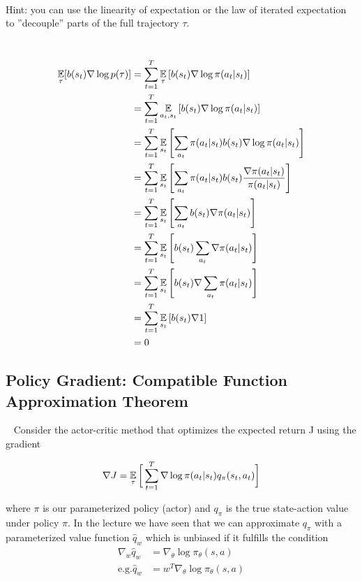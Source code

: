 \documentclass{exam}
\begin{document}
\begin{enumerate}
\begin{align*}
    \end{align*}
    Hint: you can use the linearity of expectation or the law of iterated expectation to ”decouple” parts of the full trajectory $\tau$.
    \begin{solutionorlines}[2in]
    \ \newline
    \begin{align*}
    \operatorname*{\mathbb{E}}_{\tau}[b(s_t) \nabla \log{p(\tau)}] &= \sum_{t=1}^T \operatorname*{\mathbb{E}}_{\tau}\left[b(s_t) \nabla \log{\pi(a_t|s_t)}\right]\\
    &= \sum_{t=1}^T \operatorname*{\mathbb{E}}_{a_t, s_t}\left[b(s_t) \nabla \log{\pi(a_t|s_t)}\right]\\
    &= \sum_{t=1}^T \operatorname*{\mathbb{E}}_{s_t}\left[\sum_{a_t} \pi(a_t|s_t) b(s_t) \nabla \log{\pi(a_t|s_t)}\right]\\
    &= \sum_{t=1}^T \operatorname*{\mathbb{E}}_{s_t}\left[\sum_{a_t} \pi(a_t|s_t) b(s_t) \frac{\nabla\pi(a_t|s_t)}{\pi(a_t|s_t)} \right]\\
    &= \sum_{t=1}^T \operatorname*{\mathbb{E}}_{s_t}\left[\sum_{a_t} b(s_t) \nabla\pi(a_t|s_t) \right]\\
    &= \sum_{t=1}^T \operatorname*{\mathbb{E}}_{s_t}\left[ b(s_t) \sum_{a_t} \nabla \pi(a_t|s_t) \right]\\
    &= \sum_{t=1}^T \operatorname*{\mathbb{E}}_{s_t}\left[ b(s_t)  \nabla \sum_{a_t} \pi(a_t|s_t) \right]\\
    &= \sum_{t=1}^T \operatorname*{\mathbb{E}}_{s_t}\left[ b(s_t)  \nabla 1 \right]\\
    &= 0 
    \end{align*}
    \end{solutionorlines}
\end{enumerate}


\subsection{Policy Gradient: Compatible Function Approximation Theorem}
\ \newline
Consider the actor-critic method that optimizes the expected return J using the gradient

\begin{align*}
    \nabla J = \operatorname*{\mathbb{E}}_{\tau} \bigg[ \sum_{t=1}^{T} \nabla \log \pi (a_t | s_t) q_{\pi}(s_t, a_t) \bigg]
\end{align*}

where $\pi$ is our parameterized policy (actor) and $q_{\pi}$ is the true state-action value under policy $\pi$. In the lecture we have seen that we can approximate $q_{\pi}$ with a parameterized value function $\hat{q}_w$ which is unbiased if it fulfills the condition
\begin{align*}
    \nabla_w \hat{q}_w &= \nabla_{\theta} \log \pi_{\theta} (s, a) \\
    \text{e.g.} \hat{q}_w &= w^T \nabla_{\theta} \log \pi_{\theta} (s, a)
\end{align*}
\end{document}
